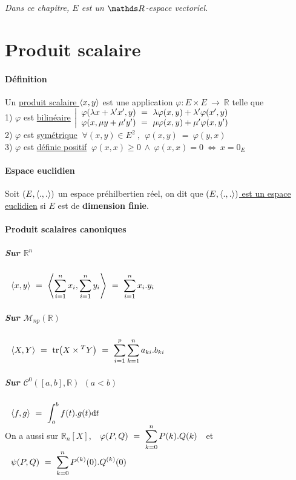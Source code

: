 

\textsl{Dans ce chapitre, $E$ est un $\R$-espace vectoriel.}
\minitoc
	\section{Produit scalaire}
		\traitd
		\paragraph{Définition}
			Un \uline{produit scalaire $\left< x,y \right>$} est une application $\varphi : E\times E ~\rightarrow ~\mathbb{R}$ telle que 
			\\ \hspace*{2cm} {\small 1) } $\varphi$ est \underline{bilinéaire} $\left\vert \ar* \varphi (\lambda x+\lambda 'x' , y) ~=~ \lambda\varphi (x,y) + \lambda '\varphi (x',y) \\ \varphi (x, \mu y + \mu 'y') ~=~ \mu\varphi (x,y) + \mu '\varphi (x,y') \ar\right.$\vspace*{3pt}\\
			\hspace*{2cm} {\small 2) } $\varphi$ est \underline{symétrique} $~\forall (x,y) \in E^2 ~,~~ \varphi (x,y) ~=~ \varphi (y,x)$ \vspace*{3pt}\\
			\hspace*{2cm} {\small 3) } $\varphi$ est \underline{définie positif} $~\varphi (x,x) \geqslant 0 ~\wedge ~ \varphi (x,x) = 0 ~\Leftrightarrow ~ x=0_E$\trait ${}$ \vspace*{-1.2cm} \traitd
		\paragraph{Espace euclidien}
			Soit $\left( E, \left< .,. \right> \right)$ un espace préhilbertien réel, on dit que \uline{$(E,\left< .,. \right>)$ est un espace euclidien} si $E$ est de \textbf{dimension finie}. \trait
		\paragraph{Produit scalaires canoniques}
		\subparagraph{Sur $\mathbb{R}^n$}
		$\displaystyle{ ~~\left< x,y \right> ~=~ \left< \sum_{i= 1 }^{n} x_i , \sum_{i= 1 }^{n} y_i  \right> ~=~ \sum_{i= 1 }^{n} x_i.y_i }$
		\subparagraph{Sur $\mathcal{M}_{np} \left(\mathbb{R}\right)$}
		$\displaystyle{ ~~\left< X,Y \right> ~=~ \mathrm{tr} \big(X\times{^TY}\big) ~=~ \sum_{i= 1 }^{p}\sum_{k= 1 }^{n} a_{ki}.b_{ki} }$
		\subparagraph{Sur $\mathcal{C}^{0}\left([a,b],\mathbb{R}\right) ~~(a<b)$}
		$\displaystyle{ ~~\left< f,g \right> ~=~ \int_a^b f(t).g(t)\mathrm{d} t }$\\
		On a aussi sur $\mathbb{R}_n[X]$, $\displaystyle{ ~~\varphi (P,Q) ~=~ \sum_{k= 0 }^{n} P(k).Q(k)~~ }$ et $\displaystyle{ ~~\psi (P,Q) ~=~ \sum_{k= 0 }^{n} P^{(k)}(0).Q^{(k)}(0) }$ \\
